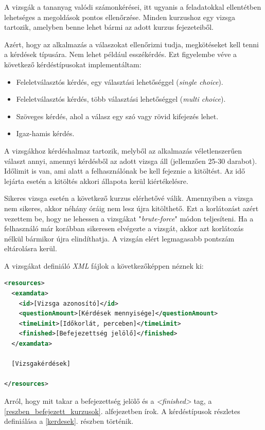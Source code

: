 \documentclass[12pt,a4paper]{article}
\newcommand{\xml}{\textit{XML}\xspace}
\begin{document}
	A vizsgák a tananyag valódi számonkérései, itt ugyanis a feladatokkal ellentétben lehetséges a megoldások pontos ellenőrzése. Minden kurzushoz egy vizsga tartozik, amelyben benne lehet bármi az adott kurzus fejezeteiből.
	
	Azért, hogy az alkalmazás a válaszokat ellenőrizni tudja, megkötéseket kell tenni a kérdések típusára. Nem lehet például esszékérdés. Ezt figyelembe véve a következő kérdéstípusokat implementáltam:
	
	\begin{itemize}
		\item Feleletválasztós kérdés, egy választási lehetőséggel (\textit{single choice}).
		\item Feleletválasztós kérdés, több választási lehetőséggel (\textit{multi choice}).
		\item Szöveges kérdés, ahol a válasz egy szó vagy rövid kifejezés lehet.
		\item Igaz-hamis kérdés.
	\end{itemize}
	
	A vizsgákhoz kérdéshalmaz tartozik, melyből az alkalmazás véletlenszerűen választ annyi, amennyi kérdésből az adott vizsga áll (jellemzően 25-30 darabot). Időlimit is van, ami alatt a felhasználónak be kell fejeznie a kitöltést. Az idő lejárta esetén a kitöltés akkori állapota kerül kiértékelésre.
	
	Sikeres vizsga esetén a következő kurzus elérhetővé válik. Amennyiben a vizsga nem sikeres, akkor néhány óráig nem lesz újra kitölthető. Ezt a korlátozást azért vezettem be, hogy ne lehessen a vizsgákat "\textit{brute-force}" módon teljesíteni. Ha a felhasználó már korábban sikeresen elvégezte a vizsgát, akkor azt korlátozás nélkül bármikor újra elindíthatja. A vizsgán elért legmagasabb pontszám eltárolásra kerül.
	
	A vizsgákat definiáló \xml fájlok a következőképpen néznek ki:
	
	\bigskip
	\begin{lstlisting}[language=XML]
<resources>
  <examdata>
	<id>[Vizsga azonosító]</id>
	<questionAmount>[Kérdések mennyisége]</questionAmount>
	<timeLimit>[Időkorlát, perceben]</timeLimit>
    <finished>[Befejezettség jelölő]</finished>
  </examdata>
  
  [Vizsgakérdések]
  
</resources>
	\end{lstlisting}

	Arról, hogy mit takar a befejezettség jelölő és a \textit{<finished>} tag, a \ref{reszben_befejezett_kurzusok}. alfejezetben írok. A kérdéstípusok részletes definiálása a \ref{kerdesek}. részben történik.
	
\end{document}
